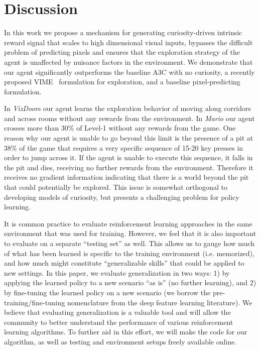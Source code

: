 \documentclass{article}
\begin{document}
\section{Discussion}
\label{sec:discussion}
In this work we propose a mechanism for generating curiosity-driven intrinsic reward signal that scales to high dimensional visual inputs, bypasses the difficult problem of predicting pixels and ensures that the exploration strategy of the agent is unaffected by nuisance factors in the environment. We demonstrate that our agent significantly outperforms the baseline A3C with no curiosity, a recently proposed VIME~\cite{houthooft2016vime} formulation for exploration, and a baseline pixel-predicting formulation.

In {\em VizDoom} our agent learns the exploration behavior of moving along corridors and across rooms without any rewards from the environment. In {\em Mario} our agent crosses more than 30\% of Level-1 without any rewards from the game. One reason why our agent is unable to go beyond this limit is the presence of a pit at 38\% of the game that requires a very specific sequence of 15-20 key presses in order to jump across it. If the agent is unable to execute this sequence, it falls in the pit and dies, receiving no further rewards from the environment. Therefore it receives no gradient information indicating that there is a world beyond the pit that could potentially be explored. This issue is somewhat orthogonal to developing models of curiosity, but presents a challenging problem for policy learning.

It is common practice to evaluate reinforcement learning approaches in the same environment that was used for training. However, we feel that it is also important to evaluate on a separate ``testing set'' as well. This allows us to gauge how much of what has been learned is specific to the training environment (i.e. memorized), and how much might constitute ``generalizable skills'' that could be applied to new settings. In this paper, we evaluate generalization in two ways: 1) by applying the learned policy to a new scenario ``as is'' (no further learning), and 2) by fine-tuning the learned policy on a new scenario (we borrow the pre-training/fine-tuning nomenclature from the deep feature learning literature). We believe that evaluating generalization is a valuable tool and will allow the community to better understand the performance of various reinforcement learning algorithms. To further aid in this effort, we will make the code for our algorithm, as well as testing and environment setups freely available online.
\end{document}

